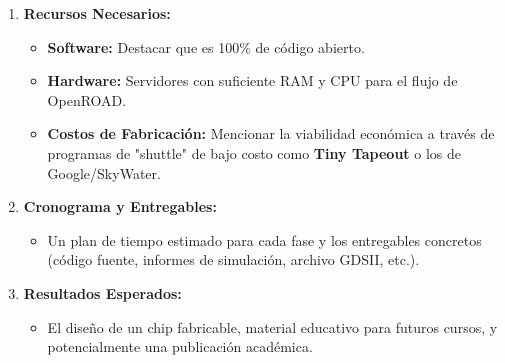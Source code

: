 \documentclass[12pt,a4paper]{article}
\begin{document}
\begin{enumerate}
    \item \textbf{Recursos Necesarios:}
    \begin{itemize}
        \item \textbf{Software:} Destacar que es 100\% de código abierto.
        \item \textbf{Hardware:} Servidores con suficiente RAM y CPU para el flujo de OpenROAD.
        \item \textbf{Costos de Fabricación:} Mencionar la viabilidad económica a través de programas de "shuttle" de bajo costo como \textbf{Tiny Tapeout} o los de Google/SkyWater.
    \end{itemize}

    \item \textbf{Cronograma y Entregables:}
    \begin{itemize}
        \item Un plan de tiempo estimado para cada fase y los entregables concretos (código fuente, informes de simulación, archivo GDSII, etc.).
    \end{itemize}

    \item \textbf{Resultados Esperados:}
    \begin{itemize}
        \item El diseño de un chip fabricable, material educativo para futuros cursos, y potencialmente una publicación académica.
    \end{itemize}
\end{enumerate}
\end{document}
